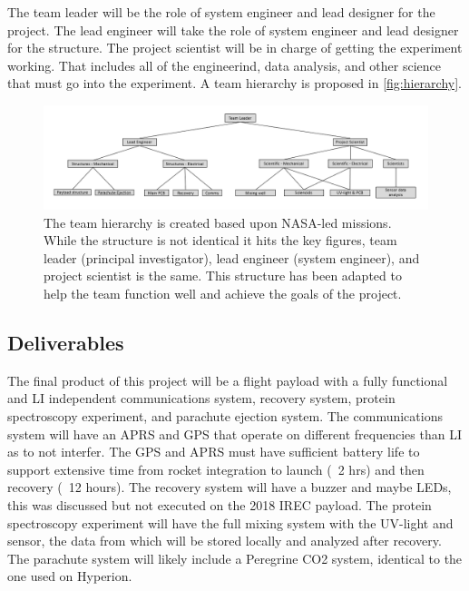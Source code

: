 \documentclass[conference]{IEEEtran} %
\begin{document}
The team leader will be the role of system engineer and lead designer for the project. The lead engineer will take the role of system engineer and lead designer for the structure.
The project scientist will be in charge of getting the experiment working. That includes all of the engineerind, data analysis, and other science that must go into the experiment.
A team hierarchy is proposed in \autoref{fig:hierarchy}.

\begin{figure}
  \includegraphics[width = \columnwidth]{figs/team_hierarchy.png}
  \caption{The team hierarchy is created based upon NASA-led missions. While the structure is not identical it hits the key figures, team leader (principal investigator), lead engineer
  (system engineer), and project scientist is the same. This structure has been adapted to help the team function well and achieve the goals of the project.}
  \label{fig:hierarchy}
\end{figure}

\subsection{Deliverables}
\label{subsec:deliverables}

  The final product of this project will be a flight payload with a fully functional and LI independent communications system, recovery system, protein spectroscopy experiment, and parachute ejection 
  system. The communications system will have an APRS and GPS that operate on different frequencies than LI as to not interfer. The GPS and APRS must have sufficient battery life 
  to support extensive time from rocket integration to launch (~2 hrs) and then recovery (~12 hours). The recovery system will have a buzzer and maybe LEDs, this was discussed 
  but not executed on the 2018 IREC payload. The protein spectroscopy experiment will have the full mixing system with the UV-light and sensor, the data from which will be stored 
  locally and analyzed after recovery. The parachute system will likely include a Peregrine CO2 system, identical to the one used on Hyperion. 
\end{document}
